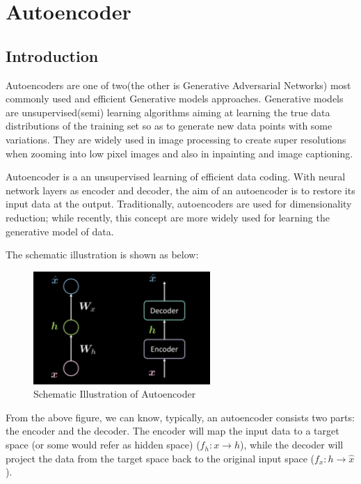 \chapter{ Autoencoder }
\section{ Introduction }

Autoencoders are one of two(the other is Generative Adversarial Networks) most commonly used and efficient Generative models approaches. Generative models are unsupervised(semi) learning algorithms aiming at learning the true data distributions of the training set so as to generate new data points with some variations. They are widely used in image processing to create super resolutions when zooming into low pixel images and also in inpainting and image captioning.

Autoencoder is a an unsupervised learning of efficient data coding. With neural network layers as encoder and decoder, the aim of an autoencoder is to restore its input data at the output. Traditionally, autoencoders are used for dimensionality reduction; while recently, this concept are more widely used for learning the generative model of data.

The schematic illustration is shown as below:

\begin{figure}[htb]
    \centering
    \includegraphics[width=0.6\textwidth]{figs/Schematic_Illustration_of_Autoencoder.png}
    \caption{Schematic Illustration of Autoencoder}
    \label{fig:Schematic_Illustration_of_Autoencoder}
\end{figure}

From the above figure, we can know, typically, an autoencoder consists two parts: the encoder and the decoder. The encoder will map the input data to a target space (or some would refer as hidden space) ($f_h: x\rightarrow h$), while the decoder will project the data from the target space back to the original input space ($f_x: h\rightarrow \hat{x}$).

